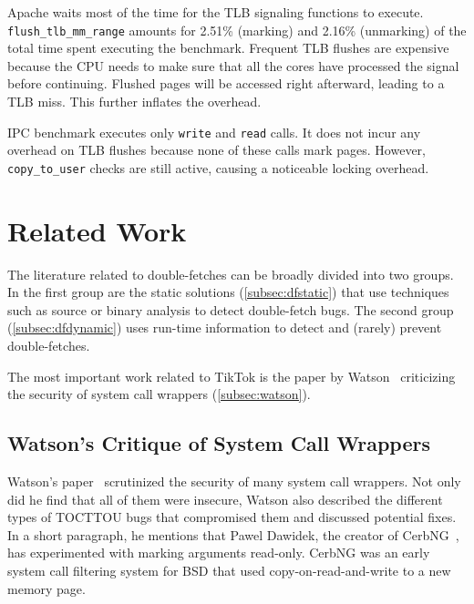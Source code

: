 \documentclass[conference]{IEEEtran}
\newcommand{\sysname}{TikTok}
\begin{document}
Apache waits most of the time for the TLB signaling functions to execute.
\texttt{flush\_tlb\_mm\_range} amounts for 2.51\% (marking) and 2.16\%
(unmarking) of the total time spent executing the benchmark. Frequent TLB
flushes are expensive because the CPU needs to make sure that all the cores have
processed the signal before continuing. Flushed pages will be accessed right
afterward, leading to a TLB miss. This further inflates the overhead.

IPC benchmark executes only \texttt{write} and \texttt{read} calls. It does not
incur any overhead on TLB flushes because none of these calls mark pages.
However, \texttt{copy\_to\_user} checks are still active, causing a noticeable
locking overhead.


\section{Related Work}
\label{sec:relatedwork}

The literature related to double-fetches can be broadly divided into two groups.
In the first group are the static solutions (\autoref{subsec:dfstatic}) that use
techniques such as source or binary analysis to detect double-fetch bugs. The
second group (\autoref{subsec:dfdynamic}) uses run-time information to detect
and (rarely) prevent double-fetches.

The most important work related to \sysname{} is the paper by
Watson~\cite{watson2007exploiting} criticizing the security of system call
wrappers (\autoref{subsec:watson}).

\subsection{Watson's Critique of System Call Wrappers}
\label{subsec:watson}
Watson's paper~\cite{watson2007exploiting} scrutinized the security of many
system call wrappers. Not only did he find that all of them were insecure,
Watson also described the different types of TOCTTOU bugs that compromised them
and discussed potential fixes. In a short paragraph, he mentions that Pawel
Dawidek, the creator of CerbNG~\cite{zak_frasunek_dawidek}, has experimented
with marking arguments read-only. CerbNG was an early system call filtering
system for BSD that used copy-on-read-and-write to a new memory page.
\end{document}

